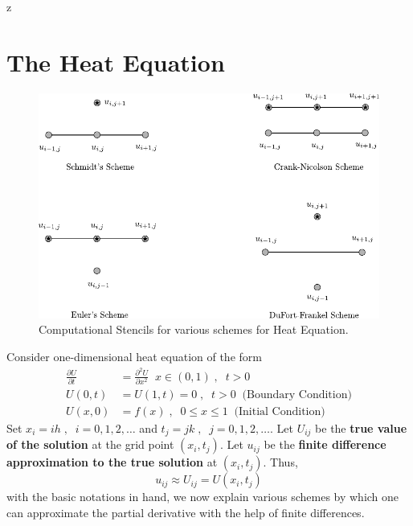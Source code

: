 z\documentclass[a4paper,12pt,twoside]{book}
\newcommand{\nll}[0]{\newline\newline}
\newcommand{\pder}[2]{\frac{\partial #1}{\partial #2}}
\begin{document}
\section{The Heat Equation}
\begin{figure}[h!]
    \centering
    \includegraphics[width=\textwidth]{HeatEquationSchemes.pdf}
    \caption{Computational Stencils for various schemes for Heat Equation.}
    \label{fig:HES}
\end{figure}
Consider one-dimensional heat equation of the form
\begin{equation}
    \begin{split}
        \pder{U}{t} &= \pder{^2U}{x^2}\;\;x \in(0,1)\;,\;\;t>0\\
        U(0,t) &= U(1,t) = 0\;,\;\;t> 0 \;\;\text{(Boundary Condition)}\\
        U(x,0) &= f(x)\;,\;\;0\le x \le 1\;\;\text{(Initial Condition)}
    \end{split}
\end{equation}
Set $x_i = ih\;,\;\;i=0,1,2,\dots$ and $t_j = jk\;,\;\;j=0,1,2,\dots$.
\nll
Let $U_{ij}$ be the \textbf{true value of the solution} at the grid point $(x_i,t_j)$. 
\nll
Let $u_{ij}$ be the \textbf{finite difference approximation to the true solution} at $(x_i,t_j)$. Thus,
\[ u_{ij} \approx U_{ij} = U(x_i,t_j) \]
with the basic notations in hand, we now explain various schemes by which one can approximate the partial derivative with the help of finite differences.
\end{document}
